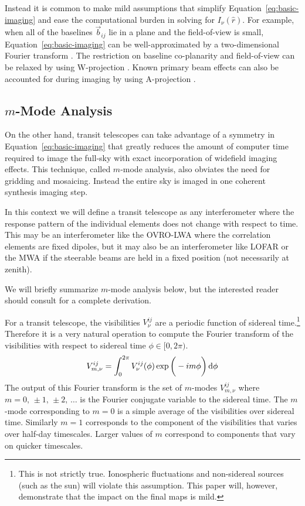 \documentclass[twocolumn]{aastex61}
\renewcommand{\d}{{\rm d}}
\begin{document}
Instead it is common to make mild assumptions that simplify Equation~\ref{eq:basic-imaging} and ease
the computational burden in solving for $I_\nu(\hat r)$. For example, when all of the baselines
$\vec b_{ij}$ lie in a plane and the field-of-view is small, Equation~\ref{eq:basic-imaging} can be
well-approximated by a two-dimensional Fourier transform \citep{2001isra.book.....T}. The
restriction on baseline co-planarity and field-of-view can be relaxed by using W-projection
\citep{2008ISTSP...2..647C}. Known primary beam effects can also be accounted for during imaging by
using A-projection \citep{2013ApJ...770...91B}.

\subsection{$m$-Mode Analysis}

On the other hand, transit telescopes can take advantage of a symmetry in
Equation~\ref{eq:basic-imaging} that greatly reduces the amount of computer time required to image
the full-sky with exact incorporation of widefield imaging effects. This technique, called $m$-mode
analysis, also obviates the need for gridding and mosaicing. Instead the entire sky is imaged in one
coherent synthesis imaging step.

In this context we will define a transit telescope as any interferometer where the response pattern
of the individual elements does not change with respect to time. This may be an interferometer like
the OVRO-LWA where the correlation elements are fixed dipoles, but it may also be an interferometer
like LOFAR or the MWA if the steerable beams are held in a fixed position (not necessarily at
zenith).

We will briefly summarize $m$-mode analysis below, but the interested reader should consult
\citet{2014ApJ...781...57S, 2015PhRvD..91h3514S} for a complete derivation.

For a transit telescope, the visibilities $V^{ij}_\nu$ are a periodic function of sidereal
time.\footnote{
    This is not strictly true. Ionospheric fluctuations and non-sidereal sources (such as the sun)
    will violate this assumption. This paper will, however, demonstrate that the impact on the final
    maps is mild.
}
Therefore it is a very natural operation to compute the Fourier transform of the visibilities with
respect to sidereal time $\phi\in[0,2\pi)$.
\begin{equation}
    V^{ij}_{m,\nu} = \int_0^{2\pi} V^{ij}_\nu(\phi)\exp\bigg(-im\phi\bigg)\,\d\phi
\end{equation}
The output of this Fourier transform is the set of $m$-modes $V^{ij}_{m,\nu}$ where
$m=0,\,\pm1,\,\pm2,\,\ldots$ is the Fourier conjugate variable to the sidereal time. The $m$-mode
corresponding to $m=0$ is a simple average of the visibilities over sidereal time. Similarly $m=1$
corresponds to the component of the visibilities that varies over half-day timescales. Larger values
of $m$ correspond to components that vary on quicker timescales.
\end{document}
